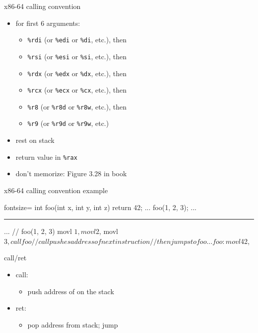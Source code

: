\begin{frame}{x86-64 calling convention}
    \begin{itemize}
    \item {} for first 6 arguments:
    \begin{itemize}
    \item {\tt \%rdi} (or {\tt \%edi} or {\tt \%di}, etc.), then
    \item {\tt \%rsi} (or {\tt \%esi} or {\tt \%si}, etc.), then
    \item {\tt \%rdx} (or {\tt \%edx} or {\tt \%dx}, etc.), then
    \item {\tt \%rcx} (or {\tt \%ecx} or {\tt \%cx}, etc.), then
    \item {\tt \%r8} (or {\tt \%r8d} or {\tt \%r8w}, etc.), then
    \item {\tt \%r9} (or {\tt \%r9d} or {\tt \%r9w}, etc.)
    \end{itemize}
    \item rest on stack
    \item return value in {\tt \%rax}
    \item don't memorize: Figure 3.28 in book
    \end{itemize}
\end{frame}


\begin{frame}[fragile,label=x8664CCExample]{x86-64 calling convention example}
\begin{ccodeNL*}{fontsize=\small}
int foo(int x, int y, int z) { return 42; }
...
    foo(1, 2, 3);
...
\end{ccodeNL*}
\hrule
\begin{asmcodeS}
...
    // foo(1, 2, 3)
    movl $1, %
    movl $2, %
    movl $3, %
    call foo  // call pushes address of next instruction
              // then jumps to foo
...
foo: 
    movl $42, %
\end{asmcodeS}
\end{frame}

\begin{frame}[fragile,label=stackFrame]{call/ret}
\begin{itemize}
\item call:
    \begin{itemize}
    \item push address of  on the stack
    \end{itemize}
\item ret:
    \begin{itemize}
    \item pop address from stack; jump
    \end{itemize}
\end{itemize}
\end{frame}

